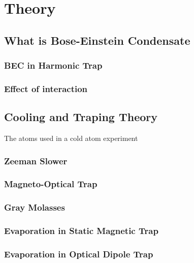 \chapter{Theory}

\section{What is Bose-Einstein Condensate}\label{ch1:bec}
\subsection{BEC in Harmonic Trap}
\subsection{Effect of interaction}

\section{Cooling and Traping Theory}
The atoms used in a cold atom experiment

\subsection{Zeeman Slower}

\subsection{Magneto-Optical Trap}

\subsection{Gray Molasses}

\subsection{Evaporation in Static Magnetic Trap}

\subsection{Evaporation in Optical Dipole Trap}
